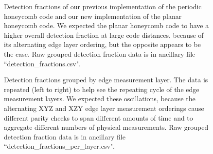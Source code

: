 \documentclass[onecolumn,a4paper,accepted=2022-09-12]{quantumarticle}
\theoremstyle{definition}
\theoremstyle{definition}
\theoremstyle{definition}
\begin{document}
\begin{figure}[h]
    \centering
    \caption{
    Detection fractions of our previous implementation of the periodic honeycomb code and our new implementation of the planar honeycomb code.
    We expected the planar honeycomb code to have a higher overall detection fraction at large code distances, because of its alternating edge layer ordering, but the opposite appears to be the case.
    Raw grouped detection fraction data is in ancillary file ``detection\_fractions.csv".
    }
    \label{fig:detection_fractions}
\end{figure}

\begin{figure}[ht!]
    \centering
    \caption{
    Detection fractions grouped by edge measurement layer.
    The data is repeated (left to right) to help see the repeating cycle of the edge measurement layers.
    We expected these oscillations, because the alternating XYZ and XZY edge layer measurement orderings cause different parity checks to span different amounts of time and to aggregate different numbers of physical measurements.
    Raw grouped detection fraction data is in ancillary file ``detection\_fractions\_per\_layer.csv".
    }
    \label{fig:detection_fractions_over_time}
\end{figure}
\end{document}
